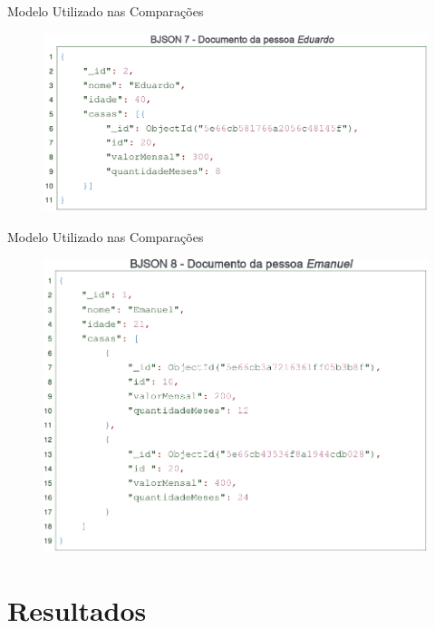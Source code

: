 \documentclass{beamer} %
\begin{document}
\begin{frame}{Modelo Utilizado nas Comparações}
    \begin{figure}
        \centering
        \includegraphics[width=\linewidth]{imagens/pessoa-eduardo-2.png}
        \label{fig:metodologia-pessoa-eduardo}
    \end{figure}
\end{frame}

\begin{frame}{Modelo Utilizado nas Comparações}
    \begin{figure}
        \centering
        \includegraphics[width=0.8\linewidth]{imagens/pessoa-emanuel-2.png}
        \label{fig:metodologia-pessoa-emanuel}
    \end{figure}
\end{frame}

\section{Resultados}
\end{document}
